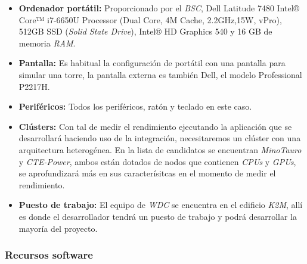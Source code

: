 \begin{itemize}

 \item \textbf{Ordenador portátil:} Proporcionado por el \textit{BSC}, Dell Latitude 7480 Intel® Core™ i7-6650U Processor (Dual Core, 4M Cache, 2.2GHz,15W, vPro), 512GB SSD (\textit{Solid State Drive}), Intel® HD Graphics 540 y 16 GB de memoria \textit{RAM}.
 
 \item \textbf{Pantalla:} Es habitual la configuración de portátil con una pantalla para simular una torre, la pantalla externa es también Dell, el modelo Professional P2217H.
 
 \item \textbf{Periféricos:} Todos los periféricos, ratón y teclado en este caso.
 
 \item \textbf{Clústers:} Con tal de medir el rendimiento ejecutando la aplicación que se desarrollará haciendo uso de la integración, necesitaremos un clúster con una arquitectura heterogénea. En la lista de candidatos se encuentran \textit{MinoTauro} y \textit{CTE-Power}, ambos están dotados de nodos que contienen \textit{CPUs} y \textit{GPUs}, se aprofundizará más en sus caracterísitcas en el momento de medir el rendimiento.
 
 \item \textbf{Puesto de trabajo:} El equipo de \textit{WDC} se encuentra en el edificio \textit{K2M}, allí es donde el desarrollador tendrá un puesto de trabajo y podrá desarrollar la mayoría del proyecto.
 
\end{itemize}

\subsubsection{Recursos software}

